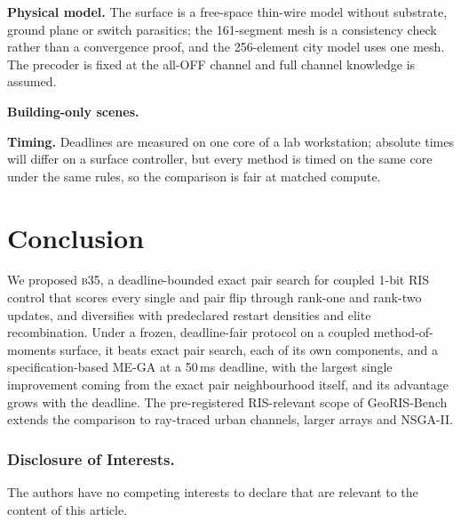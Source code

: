 \documentclass[runningheads]{llncs}
\newcommand{\bts}{\textsc{b35}}
\begin{document}
\textbf{Physical model.} The surface is a free-space thin-wire model without substrate, ground plane or switch parasitics; the 161-segment mesh is a consistency check rather than a convergence proof, and the 256-element city model uses one mesh. The precoder is fixed at the all-OFF channel and full channel knowledge is assumed.

\textbf{Building-only scenes.} 

\textbf{Timing.} Deadlines are measured on one core of a lab workstation; absolute times will differ on a surface controller, but every method is timed on the same core under the same rules, so the comparison is fair at matched compute.

\section{Conclusion}
We proposed \bts{}, a deadline-bounded exact pair search for coupled 1-bit RIS control that scores every single and pair flip through rank-one and rank-two updates, and diversifies with predeclared restart densities and elite recombination. Under a frozen, deadline-fair protocol on a coupled method-of-moments surface, it beats exact pair search, each of its own components, and a specification-based ME-GA at a 50\,ms deadline, with the largest single improvement coming from the exact pair neighbourhood itself, and its advantage grows with the deadline. The pre-registered RIS-relevant scope of GeoRIS-Bench extends the comparison to ray-traced urban channels, larger arrays and NSGA-II.

\subsubsection*{Disclosure of Interests.} The authors have no competing interests to declare that are relevant to the content of this article.



\end{document}
